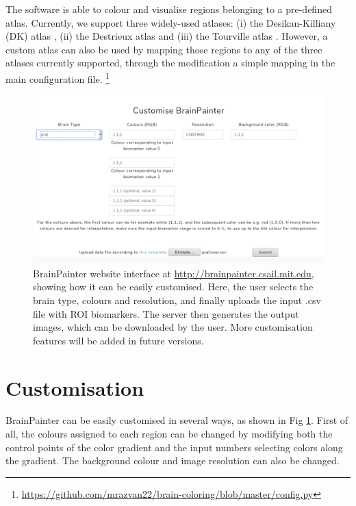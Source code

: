 \documentclass{llncs}
\begin{document}
The software is able to colour and visualise regions belonging to a pre-defined atlas. Currently, we support three widely-used atlases: (i) the Desikan-Killiany (DK) atlas \cite{desikan2006automated}, (ii) the Destrieux atlas \cite{destrieux2010automatic} and (iii) the Tourville atlas \cite{klein2012101}. However, a custom atlas can also be used by mapping those regions to any of the three atlases currently supported, through the modification a simple mapping in the main configuration file. \footnote{\url{https://github.com/mrazvan22/brain-coloring/blob/master/config.py}}


\begin{figure}[htp]
\centering
 \includegraphics[width=1\textwidth]{images/website.png}
 \caption{BrainPainter website interface at \url{http://brainpainter.csail.mit.edu}, showing how it can be easily customised. Here, the user selects the brain type, colours and resolution, and finally uploads the input .csv file with ROI biomarkers. The server then generates the output images, which can be downloaded by the user. More customisation features will be added in future versions.}
  \label{fig:website}
\end{figure}


\section{Customisation}
\label{customisation}


BrainPainter can be easily customised in several ways, as shown in Fig \ref{fig:website}. First of all, the colours assigned to each region can be changed by modifying both the control points of the color gradient and the input numbers selecting colors along the gradient. The background colour and image resolution can also be changed.  
\end{document}
